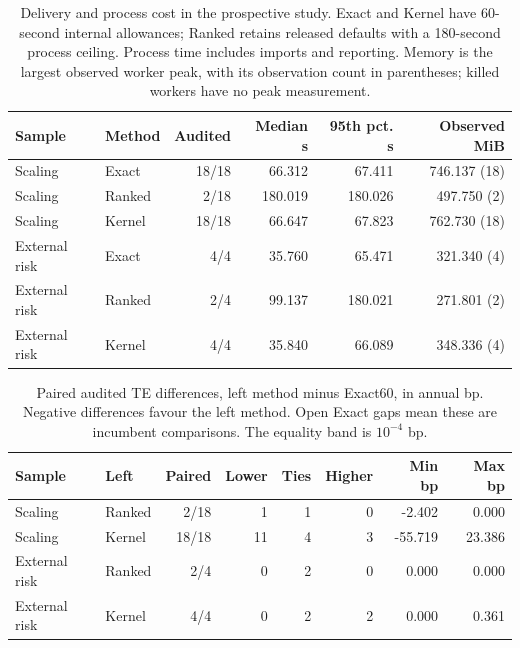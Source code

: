 \begin{table}[htbp]\centering\small
\caption{Delivery and process cost in the prospective study. Exact and Kernel have 60-second internal allowances; Ranked retains released defaults with a 180-second process ceiling. Process time includes imports and reporting. Memory is the largest observed worker peak, with its observation count in parentheses; killed workers have no peak measurement.}\label{tab:scalingtime}
\begin{tabular}{llrrrr}\toprule
Sample & Method & Audited & Median s & 95th pct. s & Observed MiB\\\midrule
Scaling & Exact & 18/18 & 66.312 & 67.411 & 746.137 (18)\\
Scaling & Ranked & 2/18 & 180.019 & 180.026 & 497.750 (2)\\
Scaling & Kernel & 18/18 & 66.647 & 67.823 & 762.730 (18)\\
External risk & Exact & 4/4 & 35.760 & 65.471 & 321.340 (4)\\
External risk & Ranked & 2/4 & 99.137 & 180.021 & 271.801 (2)\\
External risk & Kernel & 4/4 & 35.840 & 66.089 & 348.336 (4)\\
\bottomrule\end{tabular}\end{table}
\begin{table}[htbp]\centering\small
\caption{Paired audited TE differences, left method minus Exact60, in annual bp. Negative differences favour the left method. Open Exact gaps mean these are incumbent comparisons. The equality band is $10^{-4}$ bp.}\label{tab:scalingquality}
\begin{tabular}{llrrrrrr}\toprule
Sample & Left & Paired & Lower & Ties & Higher & Min bp & Max bp\\\midrule
Scaling & Ranked & 2/18 & 1 & 1 & 0 & -2.402 & 0.000\\
Scaling & Kernel & 18/18 & 11 & 4 & 3 & -55.719 & 23.386\\
External risk & Ranked & 2/4 & 0 & 2 & 0 & 0.000 & 0.000\\
External risk & Kernel & 4/4 & 0 & 2 & 2 & 0.000 & 0.361\\
\bottomrule\end{tabular}\end{table}
